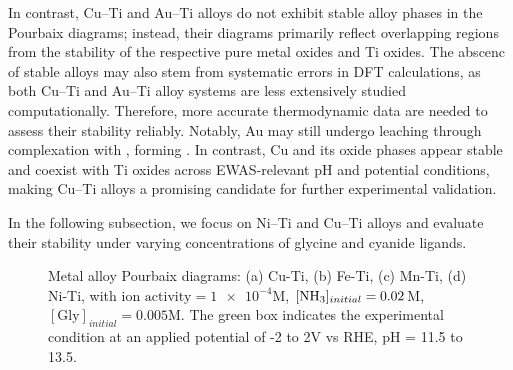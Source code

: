 \documentclass[journal=jacsat,manuscript=article]{achemso}
\begin{document}
In contrast, Cu–Ti and Au–Ti alloys do not exhibit stable alloy phases in the Pourbaix diagrams; instead, their diagrams primarily reflect overlapping regions from the stability of the respective pure metal oxides and Ti oxides. The abscenc of stable alloys may also stem from systematic errors in DFT calculations, as both Cu–Ti and Au–Ti alloy systems are less extensively studied computationally. Therefore, more accurate thermodynamic data are needed to assess their stability reliably. Notably, Au may still undergo leaching through complexation with , forming \ce{[Au(NH3)_2]^+}. In contrast, Cu and its oxide phases appear stable and coexist with Ti oxides across EWAS-relevant pH and potential conditions, making Cu–Ti alloys a promising candidate for further experimental validation.

In the following subsection, we focus on Ni–Ti and Cu–Ti alloys and evaluate their stability under varying concentrations of glycine and cyanide ligands.

\begin{figure}[htbp]
\centering
{}
\caption{Metal alloy Pourbaix diagrams: (a) Cu-Ti, (b) Fe-Ti, (c) Mn-Ti, (d) Ni-Ti, with $\text{ion activity}=\num{1e-4}$M, $[\ce{NH3}]_{initial}= 0.02$M, $[\text{Gly}]_{initial}=0.005$M. The green box indicates the experimental condition at an applied potential of -2 to 2V vs RHE, pH = 11.5 to 13.5.}
\label{fig:alloy_pourbaix_collage_1}
\end{figure}
\end{document}
